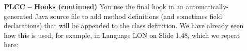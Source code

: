 \begin{minipage}[t]{\sw}
\slidenumber
\LARGE
{\bf PLCC -- Hooks (continued)}\exx
You use the final hook in an automatically-generated Java source file
to add method definitions (and sometimes field declarations)
that will be appended to the class definition.
We have already seen how this is used,
for example, in Language LON on Slide 1.48,
which we repeat here:
{\Large
{}
}
\end{minipage}
\clearpage
